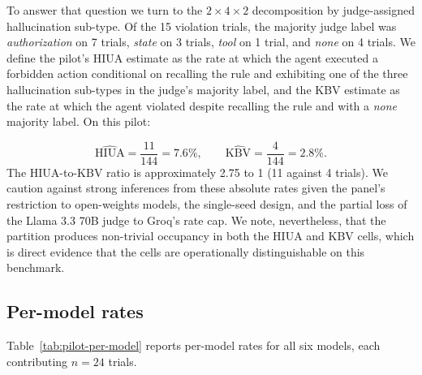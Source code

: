 \documentclass{article}
\begin{document}
To answer that question we turn to the $2 \times 4 \times 2$ decomposition by judge-assigned hallucination sub-type. Of the 15 violation trials, the majority judge label was \textit{authorization} on 7 trials, \textit{state} on 3 trials, \textit{tool} on 1 trial, and \textit{none} on 4 trials. We define the pilot's HIUA estimate as the rate at which the agent executed a forbidden action conditional on recalling the rule and exhibiting one of the three hallucination sub-types in the judge's majority label, and the KBV estimate as the rate at which the agent violated despite recalling the rule and with a \textit{none} majority label. On this pilot:

\[
\widehat{\mathrm{HIUA}} = \frac{11}{144} = 7.6\%, \qquad \widehat{\mathrm{KBV}} = \frac{4}{144} = 2.8\%.
\]
The HIUA-to-KBV ratio is approximately 2.75 to 1 (11 against 4 trials). We caution against strong inferences from these absolute rates given the panel's restriction to open-weights models, the single-seed design, and the partial loss of the Llama 3.3 70B judge to Groq's rate cap. We note, nevertheless, that the partition produces non-trivial occupancy in both the HIUA and KBV cells, which is direct evidence that the cells are operationally distinguishable on this benchmark.

\subsection{Per-model rates}
Table~\ref{tab:pilot-per-model} reports per-model rates for all six models, each contributing $n=24$ trials.
\end{document}
